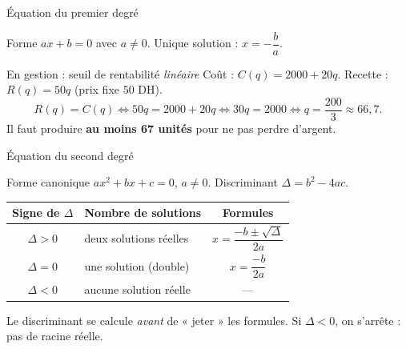 \documentclass[10pt,aspectratio=169]{beamer}
\numberwithin{dummy}{section}
\newcommand{\CT}{C}
\newcommand{\Rec}{R}
\begin{document}
\begin{frame}{Équation du premier degré}
\begin{block}{Forme}
$ax+b=0$ avec $a\neq 0$. Unique solution : $x=-\dfrac{b}{a}$.
\end{block}

\begin{exampleblock}{En gestion : seuil de rentabilité \emph{linéaire}}
Coût : $\CT(q)=2000+20q$. Recette : $\Rec(q)=50q$ (prix fixe $50$ DH).
\[
\Rec(q)=\CT(q) \iff 50q=2000+20q \iff 30q=2000 \iff q=\frac{200}{3}\approx 66{,}7.
\]
Il faut produire \textbf{au moins 67 unités} pour ne pas perdre d'argent.
\end{exampleblock}
\end{frame}

\begin{frame}{Équation du second degré}
\begin{block}{Forme canonique}
$ax^2+bx+c=0$, $a\neq 0$. Discriminant $\Delta=b^2-4ac$.
\end{block}

\vspace{-0.2em}
\renewcommand{\arraystretch}{1.35}
\begin{center}
\begin{tabular}{@{}clc@{}}
\toprule
\textbf{Signe de $\Delta$} & \textbf{Nombre de solutions} & \textbf{Formules} \\
\midrule
$\Delta>0$ & deux solutions réelles &
$\displaystyle x=\dfrac{-b\pm\sqrt{\Delta}}{2a}$ \\
$\Delta=0$ & une solution (double) &
$\displaystyle x=\dfrac{-b}{2a}$ \\
$\Delta<0$ & aucune solution réelle & --- \\
\bottomrule
\end{tabular}
\end{center}

\vspace{0.5em}
\begin{boxattention}
Le discriminant se calcule \emph{avant} de « jeter » les formules.
Si $\Delta<0$, on s'arrête : pas de racine réelle.
\end{boxattention}
\end{frame}
\end{document}
